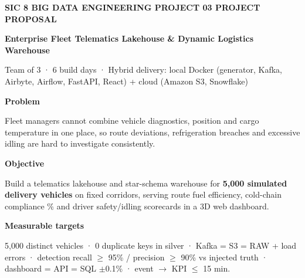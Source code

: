 \documentclass[10pt,a4paper]{article}
\begin{document}
{\color{blue}\scriptsize\bfseries SIC 8 \textperiodcentered{} BIG DATA ENGINEERING \textperiodcentered{} PROJECT 03 \textperiodcentered{} PROJECT PROPOSAL}\\[1pt]
{\raggedright{}\color{navy}\Large\bfseries Enterprise Fleet Telematics Lakehouse \& Dynamic Logistics Warehouse\par}\vspace{2pt}
{\scriptsize\color{muted} Team of 3 · 6 build days · Hybrid delivery: local Docker (generator, Kafka, Airbyte, Airflow, FastAPI, React) + cloud (Amazon S3, Snowflake)}

\vspace{4pt}
\begin{tcbraster}[raster columns=3, raster equal height, raster column skip=6pt, colback=white, colframe=cardline, boxrule=0.6pt, arc=3pt, left=4pt, right=4pt, top=3pt, bottom=3pt, fontupper=\footnotesize\raggedright]
\begin{tcolorbox}
{\small\bfseries\color{navy}Problem\par}\vspace{2pt}
Fleet managers cannot combine vehicle diagnostics, position and cargo temperature in one place, so route deviations, refrigeration breaches and excessive idling are hard to investigate consistently.
\end{tcolorbox}
\begin{tcolorbox}
{\small\bfseries\color{navy}Objective\par}\vspace{2pt}
Build a telematics lakehouse and star-schema warehouse for \textbf{5,000 simulated delivery vehicles} on fixed corridors, serving route fuel efficiency, cold-chain compliance \% and driver safety/idling scorecards in a 3D web dashboard.
\end{tcolorbox}
\begin{tcolorbox}
{\small\bfseries\color{navy}Measurable targets\par}\vspace{2pt}
5,000 distinct vehicles · 0 duplicate keys in silver · Kafka = S3 = RAW + load errors · detection recall $\geq$ 95\% / precision $\geq$ 90\% vs injected truth · dashboard = API = SQL $\pm$0.1\% · event $\rightarrow$ KPI $\leq$ 15 min.
\end{tcolorbox}
\end{tcbraster}
\end{document}
